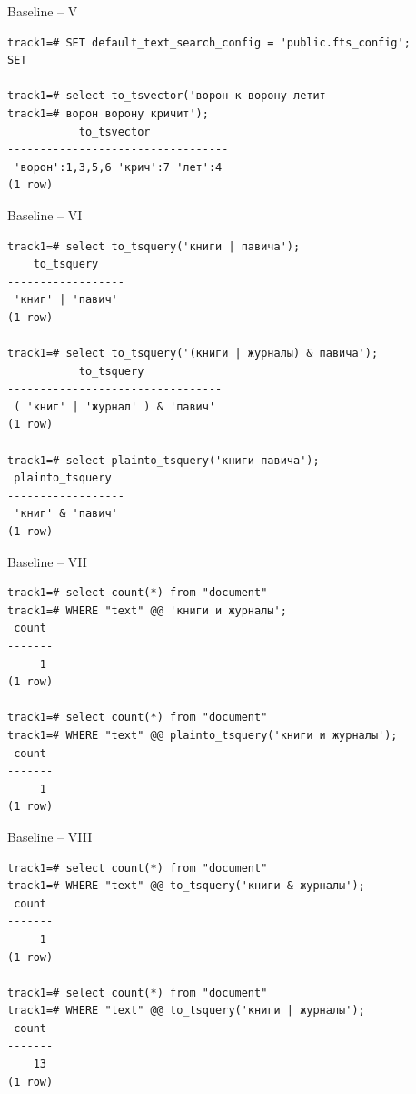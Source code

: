 \documentclass{beamer}
\begin{document}
\begin{frame}[fragile]{Baseline -- V}
\begin{footnotesize}
\begin{verbatim}
track1=# SET default_text_search_config = 'public.fts_config';
SET

track1=# select to_tsvector('ворон к ворону летит 
track1=# ворон ворону кричит');
           to_tsvector
----------------------------------
 'ворон':1,3,5,6 'крич':7 'лет':4
(1 row)
\end{verbatim}
\end{footnotesize}
\end{frame}

\begin{frame}[fragile]{Baseline -- VI}
\begin{footnotesize}
\begin{verbatim}
track1=# select to_tsquery('книги | павича');
    to_tsquery
------------------
 'книг' | 'павич'
(1 row)

track1=# select to_tsquery('(книги | журналы) & павича');
           to_tsquery
---------------------------------
 ( 'книг' | 'журнал' ) & 'павич'
(1 row)

track1=# select plainto_tsquery('книги павича');
 plainto_tsquery
------------------
 'книг' & 'павич'
(1 row)
\end{verbatim}
\end{footnotesize}
\end{frame}

\begin{frame}[fragile]{Baseline -- VII}
\begin{footnotesize}
\begin{verbatim}
track1=# select count(*) from "document" 
track1=# WHERE "text" @@ 'книги и журналы';
 count 
-------
     1
(1 row)

track1=# select count(*) from "document" 
track1=# WHERE "text" @@ plainto_tsquery('книги и журналы');
 count 
-------
     1
(1 row)
\end{verbatim}
\end{footnotesize}
\end{frame}

\begin{frame}[fragile]{Baseline -- VIII}
\begin{footnotesize}
\begin{verbatim}
track1=# select count(*) from "document" 
track1=# WHERE "text" @@ to_tsquery('книги & журналы');
 count 
-------
     1
(1 row)

track1=# select count(*) from "document" 
track1=# WHERE "text" @@ to_tsquery('книги | журналы');
 count 
-------
    13
(1 row)
\end{verbatim}
\end{footnotesize}
\end{frame}
\end{document}
